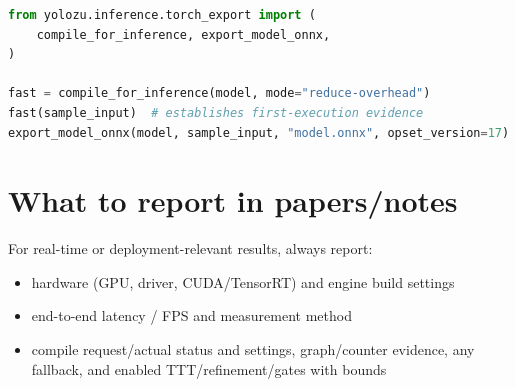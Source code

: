 \begin{lstlisting}[language=Python]
from yolozu.inference.torch_export import (
    compile_for_inference, export_model_onnx,
)

fast = compile_for_inference(model, mode="reduce-overhead")
fast(sample_input)  # establishes first-execution evidence
export_model_onnx(model, sample_input, "model.onnx", opset_version=17)
\end{lstlisting}

\section{What to report in papers/notes}
For real-time or deployment-relevant results, always report:
\begin{itemize}
  \item hardware (GPU, driver, CUDA/TensorRT) and engine build settings
  \item end-to-end latency / FPS and measurement method
  \item compile request/actual status and settings, graph/counter evidence, any fallback, and enabled TTT/refinement/gates with bounds
\end{itemize}
